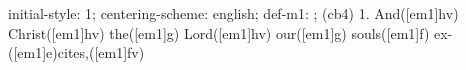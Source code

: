 initial-style: 1;
centering-scheme: english;
def-m1: \grealign;
(cb4) 1. And([em1]hv) Christ([em1]hv) the([em1]g) Lord([em1]hv) our([em1]g) souls([em1]f) ex-([em1]e)cites,([em1]fv)